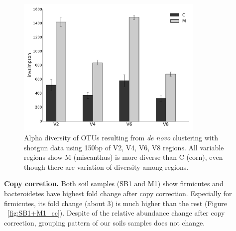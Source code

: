 \documentclass[12pt]{article}
\begin{document}
\begin{figure}[tbph!]
  \centering
  \includegraphics[width=0.8\textwidth]{figs/compare_vregion_alpha.pdf}
  \caption[Alpha diversity of OTUs resulting from {\em de novo} clustering with shotgun data using 150bp of V2, V4, V6, V8 regions]{Alpha diversity of OTUs resulting from {\em de novo} clustering with shotgun data using 150bp of V2, V4, V6, V8 regions. All variable regions show M (miscanthus) is more diverse than C (corn), even though there are variation of diversity among regions.}
  \label{fig:compare_vregion_alpha}
\end{figure}

  {\bf Copy corretion. }
  Both soil samples (SB1 and M1) show firmicutes and bacteroidetes have highest fold change after copy correction. Especially for firmicutes, its fold change (about 3) is much higher than the rest (Figure ~\ref{fig:SB1+M1_cc}). Despite of the relative abundance change after copy correction, grouping pattern of our soils samples does not change.
\end{document}
